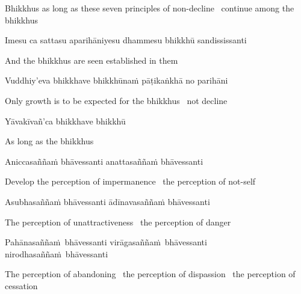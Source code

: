 \begin{english-hang}
  Bhikkhus as long as these seven principles of non-decline \breathmark\ continue among the bhikkhus
\end{english-hang}

Imesu ca sattasu aparihāniyesu dhammesu bhikkhū sandississanti

\begin{english}
  And the bhikkhus are seen established in them
\end{english}

Vuddhiy'eva bhikkhave bhikkhūnaṁ pāṭikaṅkhā no parihāni

\begin{english}
  Only growth is to be expected for the bhikkhus \breathmark\ not decline
\end{english}

\suttaRef{[AN 7.23]}

Yāvakīvañ'ca bhikkhave bhikkhū

\begin{english}
  As long as the bhikkhus
\end{english}

Aniccasaññaṁ bhāvessanti anattasaññaṁ bhāvessanti

\begin{english}
  Develop the perception of impermanence \breathmark\ the perception of not-self
\end{english}

Asubhasaññaṁ bhāvessanti ādīnavasaññaṁ bhāvessanti

\begin{english}
  The perception of unattractiveness \breathmark\ the perception of danger
\end{english}

\begin{pali-hang}
  Pahānasaññaṁ bhāvessanti virāgasaññaṁ bhāvessanti nirodhasaññaṁ bhāvessanti
\end{pali-hang}

\begin{english-hang}
  The perception of abandoning \breathmark\ the perception of dispassion \breathmark\ the perception of cessation\makeatletter\hyperlink{endnote86-appendix}\makeatother
\end{english-hang}

